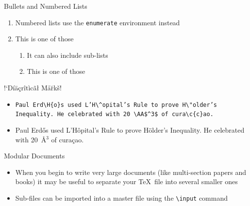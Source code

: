 \documentclass{beamer} %
\begin{document}
\begin{frame}{Bullets and Numbered Lists}

\begin{enumerate}
	\item Numbered lists use the \texttt{enumerate} environment instead
	\item This is one of those
	\begin{enumerate}[a]
		\item It can also include sub-lists
		\item This is one of those
	\end{enumerate}
\end{enumerate}

\end{frame}

\begin{frame}{!`D\'i\"a\c{c}r\^it\`ic\~a\l{} M\aa \u{r}k\v{s}!}

\begin{itemize}
	\item \texttt{Paul Erd\textbackslash H\{o\}s used L'H\textbackslash\^{}opital's Rule to prove H\textbackslash"older's Inequality. He celebrated with 20~\textbackslash AA\$\^{}3\$ of cura\textbackslash c\{c\}ao.}
	\item Paul Erd\H{o}s used L'H\^opital's Rule to prove H\"older's Inequality. He celebrated with 20~\AA$^3$ of cura\c{c}ao.
\end{itemize}

\end{frame}

\begin{frame}{Modular Documents}

\begin{itemize}
	\item When you begin to write very large documents (like multi-section papers and books) it may be useful to separate your \TeX\ file into several smaller ones
	\item Sub-files can be imported into a master file using the \texttt{\textbackslash input} command
\end{itemize}

\end{frame}

\end{document}
